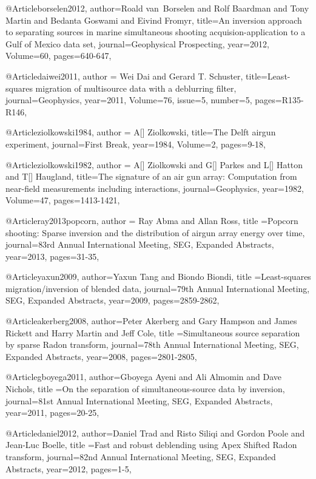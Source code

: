 @Article{borselen2012,
  author={Roald van~Borselen and Rolf Baardman and Tony Martin and Bedanta Goswami and Eivind Fromyr},
  title={An inversion approach to separating sources in marine simultaneous shooting acquision-application to a Gulf of Mexico data set},
  journal={Geophysical Prospecting},
  year=2012,
  Volume=60,
  pages={640-647},
}

@Article{daiwei2011,
  author = {Wei Dai and Gerard T. Schuster},
  title={Least-squares migration of multisource data with a deblurring filter},
  journal={Geophysics},
  year=2011,
  Volume=76,
  issue=5,
  number=5,
  pages={R135-R146},
}

	
@Article{ziolkowski1984,
  author = {A[] Ziolkowski},
  title={The Delft airgun experiment},
  journal={First Break},
  year=1984,
  Volume=2,
  pages={9-18},
}

@Article{ziolkowski1982,
  author = {A[] Ziolkowski and G[] Parkes and L[] Hatton and T[] Haugland},
  title={The signature of an air gun array:
Computation from near-field measurements including interactions},
  journal={Geophysics},
  year=1982,
  Volume=47,
  pages={1413-1421},
}

@Article{ray2013popcorn,
  author = {Ray Abma and Allan Ross},
  title ={Popcorn shooting: Sparse inversion and the distribution of airgun array energy over time},
  journal={83rd Annual International Meeting, SEG, Expanded Abstracts},
  year=2013,
  pages={31-35},
}

@Article{yaxun2009,
  author={Yaxun Tang and Biondo Biondi},
  title ={Least-squares migration/inversion of blended data},
  journal={79th Annual International Meeting, SEG, Expanded Abstracts},
  year=2009,
  pages={2859-2862},
}

@Article{akerberg2008,
  author={Peter Akerberg and Gary Hampson and James Rickett and Harry Martin and Jeff Cole},
  title ={Simultaneous source separation by sparse Radon transform},
  journal={78th Annual International Meeting, SEG, Expanded Abstracts},
  year=2008,
  pages={2801-2805},
}

@Article{gboyega2011,
  author={Gboyega Ayeni and Ali Almomin and Dave Nichols},
  title ={On the separation of simultaneous-source data by inversion},
  journal={81st Annual International Meeting, SEG, Expanded Abstracts},
  year=2011,
  pages={20-25},
}

@Article{daniel2012,
  author={Daniel Trad and Risto Siliqi and Gordon Poole and Jean-Luc Boelle},
  title ={Fast and robust deblending using Apex Shifted Radon transform},
  journal={82nd Annual International Meeting, SEG, Expanded Abstracts},
  year=2012,
  pages={1-5},
}

